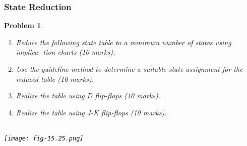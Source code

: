 \documentclass[twocolumn]{article}
\newtheorem{prob}{Problem}
\begin{document}
\subsubsection*{State Reduction}
\begin{prob}
  \begin{enumerate}
  \item Reduce the following state table to a minimum number of states using implica-
    tion charts (10 marks).
  \item Use the guideline method to determine a suitable state assignment for the
    reduced table (10 marks).
  \item Realize the table using D flip-flops (10 marks).
  \item Realize the table using J-K flip-flops (10 marks).
  \end{enumerate}\\
  \texttt{[image: fig-15.25.png]}
\end{prob}




\end{document}
